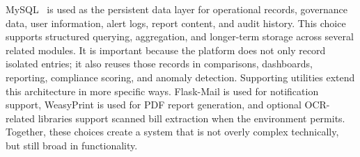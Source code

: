 \documentclass[11pt,a4paper]{article}
\begin{document}
MySQL~\cite{mysql2024} is used as the persistent data layer for operational records, governance data, user information, alert logs, report content, and audit history. This choice supports structured querying, aggregation, and longer-term storage across several related modules. It is important because the platform does not only record isolated entries; it also reuses those records in comparisons, dashboards, reporting, compliance scoring, and anomaly detection. Supporting utilities extend this architecture in more specific ways. Flask-Mail is used for notification support, WeasyPrint is used for PDF report generation, and optional OCR-related libraries support scanned bill extraction when the environment permits. Together, these choices create a system that is not overly complex technically, but still broad in functionality.
\end{document}
